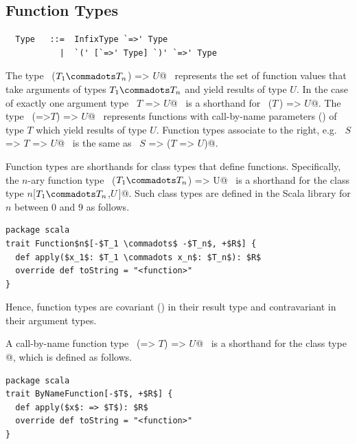 
\subsection{Function Types}
\label{sec:function-types}

\syntax\begin{lstlisting}
  Type   ::=  InfixType `=>' Type
           |  `(' [`=>' Type] `)' `=>' Type
\end{lstlisting}
The type ~\lstinline@($T_1 \commadots T_n$) => $U$@~ represents the set of function
values that take arguments of types $T_1 \commadots T_n$ and yield
results of type $U$.  In the case of exactly one argument type
~\lstinline@$T$ => $U$@~ is a shorthand for ~\lstinline@($T\,$) => $U$@.  
The type ~\lstinline@(=>$T$) => $U$@~ represents functions with
call-by-name parameters () of type $T$ which yield
results of type $U$.
Function types associate to the right, e.g.
~\lstinline@$S$ => $T$ => $U$@~ is the same as 
~\lstinline@$S$ => ($T$ => $U$)@.

Function types are shorthands for class types that define 
functions.  Specifically, the $n$-ary function type 
~\lstinline@($T_1 \commadots T_n$) => U@~ is a shorthand for the class type
\lstinline@Function$n$[$T_1 \commadots T_n$,$U\,$]@. Such class
types are defined in the Scala library for $n$ between 0 and 9 as follows.
\begin{lstlisting}
package scala 
trait Function$n$[-$T_1 \commadots$ -$T_n$, +$R$] {
  def apply($x_1$: $T_1 \commadots x_n$: $T_n$): $R$ 
  override def toString = "<function>" 
}
\end{lstlisting}
Hence, function types are covariant () in their
result type and contravariant in their argument types.

A call-by-name function type ~\lstinline@(=> $T$) => $U$@~ is a
shorthand for the class type
\lstinline@ByNameFunction[$T$,$U\,$]@, which is defined as follows.
\begin{lstlisting}
package scala 
trait ByNameFunction[-$T$, +$R$] {
  def apply($x$: => $T$): $R$ 
  override def toString = "<function>" 
}
\end{lstlisting}

